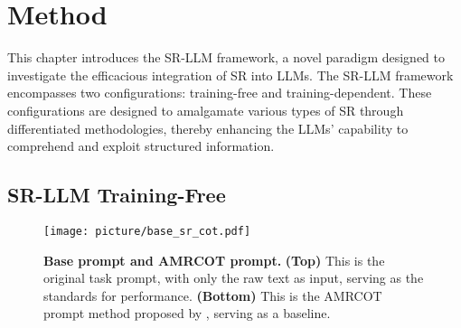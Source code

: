 

\section{Method}

This chapter introduces the SR-LLM framework,  a novel paradigm designed to investigate the efficacious integration of SR into LLMs. The SR-LLM framework encompasses two configurations: training-free and training-dependent. These configurations are designed to amalgamate various types of SR through differentiated methodologies, thereby enhancing the LLMs' capability to comprehend and exploit structured information. 



\subsection{SR-LLM Training-Free}
\begin{figure}[h!]
\centering
\vspace{-0.2cm}
\texttt{[image: picture/base\_sr\_cot.pdf]}
\caption{\textbf{Base prompt and AMRCOT prompt.} \textbf{(Top)} This is the original task prompt, with only the raw text as input, serving as the standards for performance. \textbf{(Bottom)} This is the AMRCOT prompt method proposed by \citet{jin2024analyzing}, serving as a baseline.}
\label{fig:base_sr_cot}
\vspace{-0.2cm}
\end{figure}


